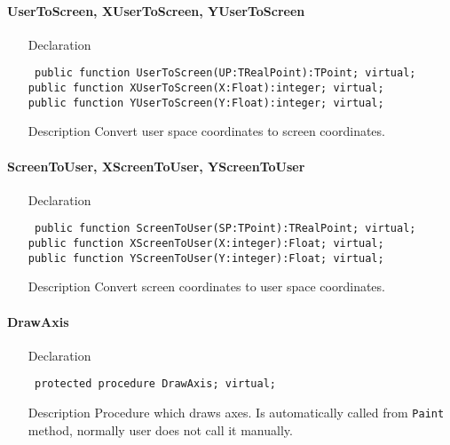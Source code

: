 \documentclass[12pt,a4paper,oneside]{report}
\newcommand{\declarationitem}[1]{{\addfontfeatures{FakeBold=1.3} #1}}
\newcommand{\descriptiontitle}[1]{{\addfontfeatures{FakeSlant}#1}}
\newcommand{\code}[1]{\texttt{#1}}
\begin{document}
\paragraph{UserToScreen, XUserToScreen, YUserToScreen}\hspace*{\fill}
\label{lmcoordsys.TCoordSys-UserToScreen}
\begin{itemize}\item[\declarationitem{Declaration}\hfill]
	\begin{flushleft}
		\code{
			public function UserToScreen(UP:TRealPoint):TPoint; virtual;\\
			public function XUserToScreen(X:Float):integer; virtual;\\
			public function YUserToScreen(Y:Float):integer; virtual;}
	\end{flushleft}
	\item[\descriptiontitle{Description}]
	Convert user space coordinates to screen coordinates.
\end{itemize}

\paragraph{ScreenToUser, XScreenToUser, YScreenToUser}\hspace*{\fill}
\label{lmcoordsys.TCoordSys-XScreenToUser}
\begin{itemize}\item[\declarationitem{Declaration}\hfill]
	\begin{flushleft}
		\code{
			public function ScreenToUser(SP:TPoint):TRealPoint; virtual;\\
			public function XScreenToUser(X:integer):Float; virtual;\\
			public function YScreenToUser(Y:integer):Float; virtual;}
	\end{flushleft}
	\item[\descriptiontitle{Description}]
	Convert screen coordinates to user space coordinates.
\end{itemize}
\paragraph{DrawAxis}\hspace*{\fill}
\label{lmcoordsys.TCoordSys-DrawAxis}
\begin{itemize}\item[\declarationitem{Declaration}\hfill]
	\begin{flushleft}
		\code{
			protected procedure DrawAxis; virtual;}
	\end{flushleft}
	\item[\descriptiontitle{Description}] Procedure which draws axes. Is automatically called from \code{Paint} method, normally user does not call it manually.
\end{itemize}
\end{document}
